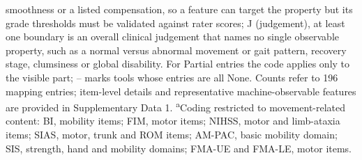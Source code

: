 smoothness or a listed compensation, so a feature can target the property but its grade thresholds must be validated against rater scores; J (judgement), at least one boundary is an overall clinical judgement that names no single observable property, such as a normal versus abnormal movement or gait pattern, recovery stage, clumsiness or global disability. For Partial entries the code applies only to the visible part; -- marks tools whose entries are all None. Counts refer to 196 mapping entries; item-level details and representative machine-observable features are provided in Supplementary Data 1. \textsuperscript{a}Coding restricted to movement-related content: BI, mobility items; FIM, motor items; NIHSS, motor and limb-ataxia items; SIAS, motor, trunk and ROM items; AM-PAC, basic mobility domain; SIS, strength, hand and mobility domains; FMA-UE and FMA-LE, motor items.
\endgroup


